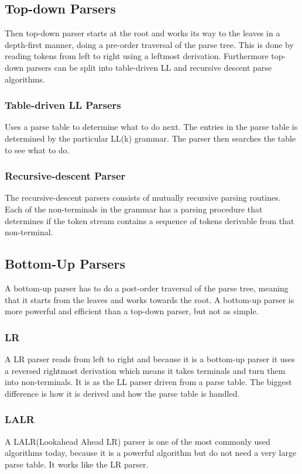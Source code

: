 \subsection{Top-down Parsers}
Then top-down parser starts at the root and works its way to the leaves in a depth-first manner, doing a pre-order traversal of the parse tree. This is done by reading tokens from left to right using a leftmost derivation. Furthermore top-down parsers can be split into table-driven LL and recursive descent parse algorithms.

\subsubsection*{Table-driven LL Parsers}
Uses a parse table to determine what to do next. The entries in the parse table is determined by the particular LL(k) grammar. The parser then searches the table to see what to do.

\subsubsection*{Recursive-descent Parser}
The recursive-descent parsers consists of mutually recursive parsing routines. Each of the non-terminals in the grammar has a parsing procedure that determines if the token stream contains a sequence of tokens derivable from that non-terminal.

\subsection{Bottom-Up Parsers}
A bottom-up parser has to do a post-order traversal of the parse tree, meaning that it starts from the leaves and works towards the root.
A bottom-up parser is more powerful and efficient than a top-down parser, but not as simple.

\subsubsection*{LR}
A LR parser reads from left to right and because it is a bottom-up parser it uses a reversed rightmost derivation which means it takes terminals and turn them into non-terminals. It is as the LL parser driven from a parse table. The biggest difference is how it is derived and how the parse table is handled.  

\subsubsection*{LALR}
A LALR(Lookahead Ahead LR) parser is one of the most commonly used algorithms today, because it is a powerful algorithm but do not need a very large parse table. It works like the LR parser.
